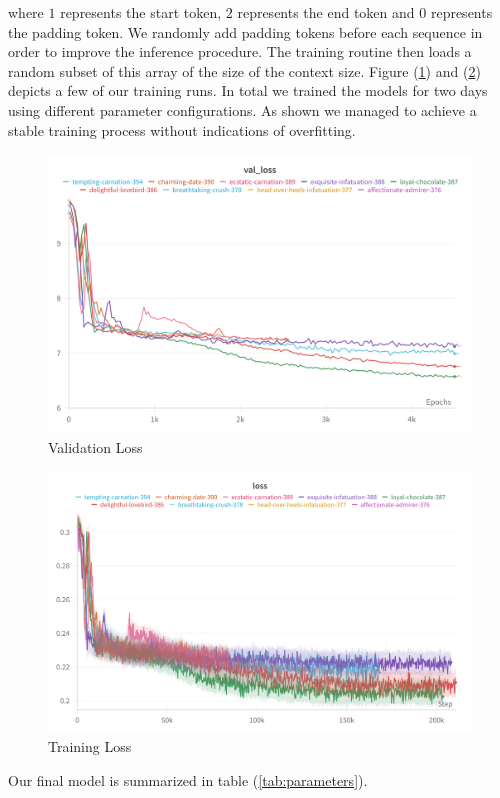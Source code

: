 \documentclass[a4paper,12pt]{extarticle}
\begin{document}
where $1$ represents the start token, $2$ represents the end token and $0$ represents the padding token.
We randomly add padding tokens before each sequence in order to improve the inference procedure.
The training routine then loads a random subset of this array of the size of the context size.
Figure (\ref{fig:val_loss}) and (\ref{fig:train_loss}) depicts a few of our training runs. In total we trained the models for two days using different parameter configurations. As shown we managed to achieve a stable training process without indications of overfitting.
\begin{figure}[H]
  \label{fig:val_loss}
  \centering
  \includegraphics[width=\textwidth]{val_loss.png}
  \caption{Validation Loss}
\end{figure}

\begin{figure}[H]
  \label{fig:train_loss}
  \centering
  \includegraphics[width=\textwidth]{train_loss.png}
  \caption{Training Loss}
\end{figure}
Our final model is summarized in table (\ref{tab:parameters}).
\end{document}
